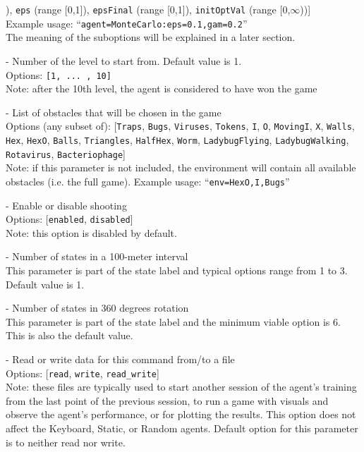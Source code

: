 \begin{description}
[\texttt{gam} (range [0,1]), \texttt{eps} (range [0,1]), \texttt{epsFinal} (range [0,1]), \texttt{initOptVal} (range [0,$\infty$))]\\
Example usage: ``\texttt{agent=MonteCarlo:eps=0.1,gam=0.2}''\\
The meaning of the suboptions will be explained in a later section.
\item[level] - Number of the level to start from. Default value is 1. \label{opt:level}\\
Options: \texttt{[1, ... , 10]}\\
Note: after the 10th level, the agent is considered to have won the game
\item[env] - List of obstacles that will be chosen in the game \label{opt:env}\\
Options (any subset of): [\texttt{Traps}, \texttt{Bugs}, \texttt{Viruses}, \texttt{Tokens},
\texttt{I}, \texttt{O}, \texttt{MovingI}, \texttt{X}, \texttt{Walls}, \texttt{Hex},
\texttt{HexO}, \texttt{Balls}, \texttt{Triangles}, \texttt{HalfHex},
\texttt{Worm}, \texttt{LadybugFlying}, \texttt{LadybugWalking},
\texttt{Rotavirus}, \texttt{Bacteriophage}]\\
Note: if this parameter is not included, the environment will contain all available obstacles (i.e. the full game).
Example usage: ``\texttt{env=HexO,I,Bugs}''\\
\item[shooting] - Enable or disable shooting \label{opt:shooting}\\
Options: [\texttt{enabled}, \texttt{disabled}]\\
Note: this option is disabled by default.
\item[dists] - Number of states in a 100-meter interval \label{opt:dists}\\
This parameter is part of the state label and typical options range from 1 to 3. Default value is 1.
\item[rots] - Number of states in 360 degrees rotation \label{opt:rots}\\
This parameter is part of the state label and the minimum viable option is 6. This is also the default value.
\item[database] - Read or write data for this command from/to a file \label{opt:database}\\
Options: [\texttt{read}, \texttt{write}, \texttt{read\_write}]\\
Note: these files are typically used to start another session of the agent's training from the last point of the previous session, to run a game with visuals and observe the agent's performance, or for plotting the results. This option does not affect the Keyboard, Static, or Random agents. Default option for this parameter is to neither read nor write.

\end{description}
